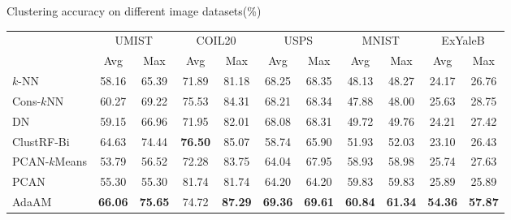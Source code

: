 \begin{table}[!htbp]
	{Clustering accuracy on different image datasets(\%)}
	\label{tab2:Acc}
	\centering
		\begin{tabular}{lcccccccccc}
			\toprule
			 &\multicolumn{2}{c}{UMIST} &\multicolumn{2}{c}{COIL20}  &\multicolumn{2}{c}{USPS} &\multicolumn{2}{c}{MNIST} &\multicolumn{2}{c}{ExYaleB}
			\\
			\cmidrule(lr){2-3}\cmidrule(lr){4-5}\cmidrule(lr){6-7}\cmidrule(lr){8-9}\cmidrule(lr){10-11}
			& Avg & Max & Avg & Max & Avg & Max & Avg & Max & Avg & Max  \\
			\midrule
			$k$-NN   & 58.16& 65.39& 71.89& 81.18& 68.25& 68.35& 48.13& 48.27 & 24.17& 26.76\\
			Cons-$k$NN  & 60.27& 69.22 & 75.53& 84.31& 68.21& 68.34& 47.88& 48.00& 25.63& 28.75\\
			DN  & 59.15& 66.96 & 71.95& 82.01& 68.08& 68.31& 49.72& 49.76 & 24.21& 27.42 \\
			ClustRF-Bi  & 64.63& 74.44& \textbf{76.50}& 85.07 & 58.74& 65.90& 51.93& 52.03& 23.10& 26.43 \\
			PCAN-$k$Means & 53.79& 56.52& 72.28& 83.75& 64.04& 67.95& 58.93& 58.98 & 25.74& 27.63\\
			PCAN & 55.30& 55.30& 81.74& 81.74& 64.20& 64.20&59.83&59.83& 25.89& 25.89\\
			AdaAM & \textbf{66.06}& \textbf{75.65}& 74.72& \textbf{87.29}& \textbf{69.36}& \textbf{69.61}& \textbf{60.84}& \textbf{61.34}& \textbf{54.36}& \textbf{57.87}\\
			\bottomrule
		\end{tabular}
\end{table}